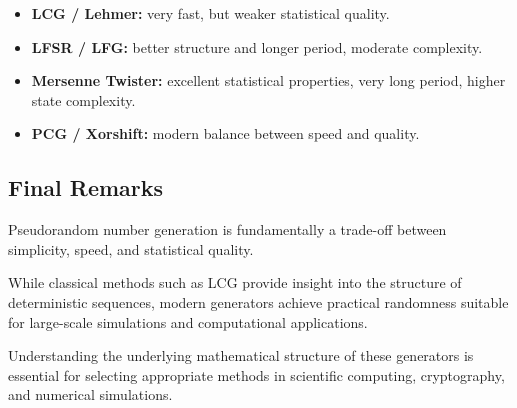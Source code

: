 \begin{itemize}
    \item \textbf{LCG / Lehmer:} very fast, but weaker statistical quality.
    \item \textbf{LFSR / LFG:} better structure and longer period, moderate complexity.
    \item \textbf{Mersenne Twister:} excellent statistical properties, very long period, higher state complexity.
    \item \textbf{PCG / Xorshift:} modern balance between speed and quality.
\end{itemize}

\subsection{Final Remarks}

Pseudorandom number generation is fundamentally a trade-off between simplicity, speed, and statistical quality.

While classical methods such as LCG provide insight into the structure of deterministic sequences, modern generators achieve practical randomness suitable for large-scale simulations and computational applications.

Understanding the underlying mathematical structure of these generators is essential for selecting appropriate methods in scientific computing, cryptography, and numerical simulations.
